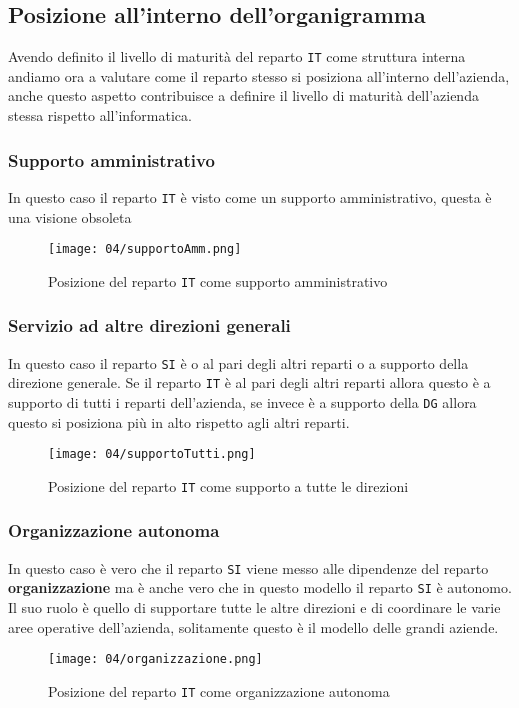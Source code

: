     \subsection{Posizione all'interno dell'organigramma}

        Avendo definito il livello di maturità del reparto \texttt{IT} come struttura interna andiamo ora a valutare come il reparto stesso si posiziona all'interno dell'azienda, anche questo aspetto contribuisce a definire il livello di maturità dell'azienda stessa rispetto all'informatica.
        \subsubsection{Supporto amministrativo} 
            In questo caso il reparto \texttt{IT} è visto come un supporto amministrativo, questa è una visione obsoleta 
            \begin{figure}[H]
                \centering 
                \texttt{[image: 04/supportoAmm.png]}
                \caption{Posizione del reparto \texttt{IT} come supporto amministrativo}
            \end{figure}
        \subsubsection{Servizio ad altre direzioni generali}
            In questo caso il reparto \texttt{SI} è o al pari degli altri reparti o a supporto della direzione generale. Se il reparto \texttt{IT} è al pari degli altri reparti allora questo è a supporto di tutti i reparti dell'azienda, se invece è a supporto della \texttt{DG} allora questo si posiziona più in alto rispetto agli altri reparti.
            \begin{figure}[H]
                \centering 
                \texttt{[image: 04/supportoTutti.png]}
                \caption{Posizione del reparto \texttt{IT} come supporto a tutte le direzioni}
            \end{figure}
        \subsubsection{Organizzazione autonoma}
            In questo caso è vero che il reparto \texttt{SI} viene messo alle dipendenze del reparto \textbf{organizzazione} ma è anche vero che in questo modello il reparto \texttt{SI} è autonomo. Il suo ruolo è quello di supportare tutte le altre direzioni e di coordinare le varie aree operative dell'azienda, solitamente questo è il modello delle grandi aziende.
            \begin{figure}[H]
                \centering 
                \texttt{[image: 04/organizzazione.png]}
                \caption{Posizione del reparto \texttt{IT} come organizzazione autonoma}
            \end{figure}
